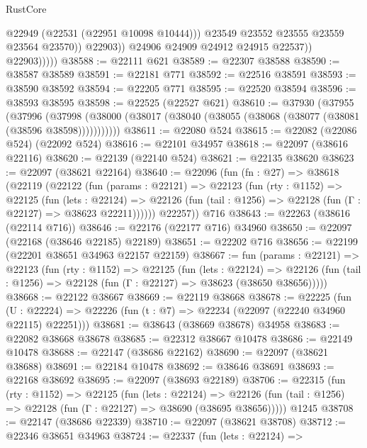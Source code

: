 \begin{lexlean}{RustCore}
\begin{coremodule}
                            @22949
                            (@22531 (@22951 @10098 @10444)))
                          @23549
                          @23552
                          @23555
                          @23559
                          @23564
                          @23570))
                      @22903))
                  @24906
                  @24909
                  @24912
                  @24915
                  @22537))
              @22903)))))
@38588 := @22111 @621
@38589 := @22307 @38588
@38590 := @38587 @38589
@38591 := @22181 @771
@38592 := @22516 @38591
@38593 := @38590 @38592
@38594 := @22205 @771
@38595 := @22520 @38594
@38596 := @38593 @38595
@38598 := @22525 (@22527 @621)
@38610 := @37930
    (@37955
      (@37996
        (@37998 (@38000 (@38017 (@38040 (@38055 (@38068 (@38077 (@38081 (@38596 @38598)))))))))))
@38611 := @22080 @524
@38615 := @22082 (@22086 @524) (@22092 @524)
@38616 := @22101 @34957
@38618 := @22097 (@38616 @22116)
@38620 := @22139 (@22140 @524)
@38621 := @22135 @38620
@38623 := @22097 (@38621 @22164)
@38640 := @22096
    (fun (fn : @27) =>
    @38618
      (@22119
        (@22122
          (fun (params : @22121) =>
          @22123
            (fun (rty : @1152) =>
            @22125
              (fun (lets : @22124) =>
              @22126 (fun (tail : @1256) => @22128 (fun (Γ : @22127) => @38623 @22211))))))
        @22257))
    @716
@38643 := @22263 (@38616 (@22114 @716))
@38646 := @22176 (@22177 @716) @34960
@38650 := @22097 (@22168 (@38646 @22185) @22189)
@38651 := @22202 @716
@38656 := @22199 (@22201 @38651 @34963 @22157 @22159)
@38667 := fun (params : @22121) =>
  @22123
    (fun (rty : @1152) =>
    @22125
      (fun (lets : @22124) =>
      @22126 (fun (tail : @1256) => @22128 (fun (Γ : @22127) => @38623 (@38650 @38656)))))
@38668 := @22122 @38667
@38669 := @22119 @38668
@38678 := @22225
    (fun (U : @22224) => @22226 (fun (t : @7) => @22234 (@22097 (@22240 @34960 @22115) @22251)))
@38681 := @38643 (@38669 @38678) @34958
@38683 := @22082 @38668 @38678
@38685 := @22312 @38667 @10478
@38686 := @22149 @10478
@38688 := @22147 (@38686 @22162)
@38690 := @22097 (@38621 @38688)
@38691 := @22184 @10478
@38692 := @38646 @38691
@38693 := @22168 @38692
@38695 := @22097 (@38693 @22189)
@38706 := @22315
    (fun (rty : @1152) =>
    @22125
      (fun (lets : @22124) =>
      @22126 (fun (tail : @1256) => @22128 (fun (Γ : @22127) => @38690 (@38695 @38656)))))
    @1245
@38708 := @22147 (@38686 @22339)
@38710 := @22097 (@38621 @38708)
@38712 := @22346 @38651 @34963
@38724 := @22337
    (fun (lets : @22124) =>

\end{coremodule}
\end{lexlean}
